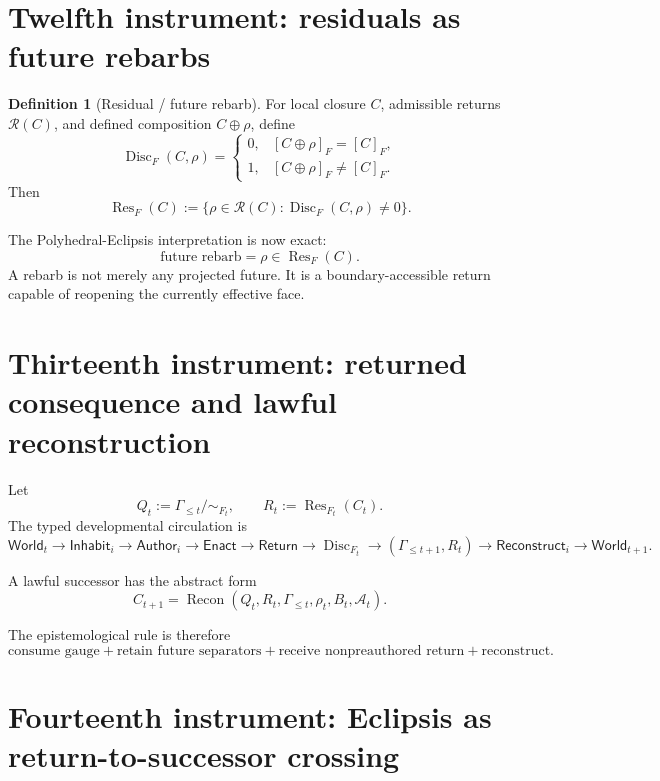 \documentclass[10pt]{article}
\theoremstyle{pe}
\theoremstyle{definition}
\newtheorem{definition}[theorem]{Definition}
\newcommand{\Disc}{\operatorname{Disc}}
\newcommand{\Res}{\operatorname{Res}}
\newcommand{\Recon}{\operatorname{Recon}}
\newcommand{\World}{\mathsf{World}}
\newcommand{\Return}{\mathsf{Return}}
\begin{document}
\section{Twelfth instrument: residuals as future rebarbs}

\begin{definition}[Residual / future rebarb]
For local closure \(C\), admissible returns \(\mathcal R(C)\), and defined composition \(C\oplus\rho\), define
\[
  \Disc_F(C,\rho)
  =
  \begin{cases}
    0,&[C\oplus\rho]_F=[C]_F,\\
    1,&[C\oplus\rho]_F\neq[C]_F.
  \end{cases}
\]
Then
\begin{equation}\label{eq:residual}
  \Res_F(C)
  :=
  \{\rho\in\mathcal R(C):\Disc_F(C,\rho)\neq0\}.
\end{equation}
\end{definition}

The Polyhedral-Eclipsis interpretation is now exact:
\[
  \boxed{
  \text{future rebarb}
  =
  \rho\in\Res_F(C).
  }
\]
A rebarb is not merely any projected future.  It is a boundary-accessible return capable of reopening the currently effective face.

\section{Thirteenth instrument: returned consequence and lawful reconstruction}

Let
\[
  Q_t:=\Gamma_{\le t}/\!\sim_{F_t},
  \qquad
  R_t:=\Res_{F_t}(C_t).
\]
The typed developmental circulation is
\begin{equation}\label{eq:ctl-cycle}
  \World_t
  \to
  \mathsf{Inhabit}_i
  \to
  \mathsf{Author}_i
  \to
  \mathsf{Enact}
  \to
  \Return
  \to
  \Disc_{F_t}
  \to
  (\Gamma_{\le t+1},R_t)
  \to
  \mathsf{Reconstruct}_i
  \to
  \World_{t+1}.
\end{equation}

A lawful successor has the abstract form
\begin{equation}\label{eq:successor}
  C_{t+1}
  =
  \Recon(Q_t,R_t,\Gamma_{\le t},\rho_t,B_t,\mathcal A_t).
\end{equation}

The epistemological rule is therefore
\[
  \boxed{
  \text{consume gauge}
  +
  \text{retain future separators}
  +
  \text{receive nonpreauthored return}
  +
  \text{reconstruct}.
  }
\]

\section{Fourteenth instrument: Eclipsis as return-to-successor crossing}
\end{document}
